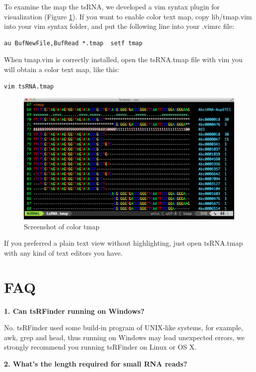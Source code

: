 \documentclass[11pt, a4paper]{article}
\begin{document}
To examine the map the tsRNA, we developed a vim syntax plugin for visualization (Figure \ref{tmap}). If you want to enable color text map, copy lib/tmap.vim into your vim syntax folder, and put the following line into your .vimrc file:

\begin{verbatim}
au BufNewFile,BufRead *.tmap  setf tmap
\end{verbatim}

When tmap.vim is correctly installed, open the tsRNA.tmap file with vim you will obtain a color text map, like this:

\begin{verbatim}
vim tsRNA.tmap
\end{verbatim}

\begin{figure}[htbp]
\begin{center}
\includegraphics[width=12cm]{tmap.png}
\caption{Screenshot of color tmap} 
\label{tmap}
\end{center}
\end{figure}

If you preferred a plain text view without highlighting, just open tsRNA.tmap with any kind of text editors you have.

\section{FAQ}

\textbf{1. Can tsRFinder running on Windows?}

No. tsRFinder used some build-in program of UNIX-like systems, for example, awk, grep and head, thus running on Windows may lead unexpected errors, we strongly recommend you running tsRFinder on Linux or OS X.

\textbf{2. What's the length required for small RNA reads?}
\end{document}

